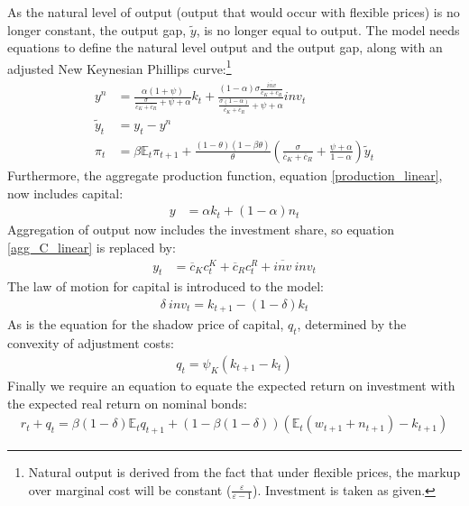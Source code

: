 \documentclass[titlepage]{\econtex}\newcommand{\texname}{ConsumptionHeterogeneity}
\begin{document}
As the natural level of output (output that would occur with flexible prices) is no longer constant, the output gap, $\tilde{y}$, is no longer equal to output. The model needs equations to define the natural level output and the output gap, along with an adjusted New Keynesian Phillips curve:\footnote{Natural output is derived from the fact that under flexible prices, the markup over marginal cost will be constant ($\frac{\varepsilon}{\varepsilon-1}$). Investment is taken as given.}
\begin{align}
y^{n} &= \frac{\alpha(1+\psi)}{\frac{\sigma }{\overline{c}_{K}+\overline{c}_{R}} + \psi+ \alpha} k_{t} +\frac{(1-\alpha) \sigma \frac{\overline{\textit{inv}}}{\overline{c}_{K}+\overline{c}_{R}}}{ \frac{\sigma (1-\alpha)}{\overline{c}_{K}+\overline{c}_{R}} + \psi + \alpha} \textit{inv}_t \label{y_nat_linear} \\
\tilde{y}_t &= y_t - y^{n}	\label{output_gap_linear} \\
\pi_t &=\beta \mathbb{E}_t\pi_{t+1}+\frac{(1-\theta)(1-\beta\theta)}{\theta}\left( \frac{\sigma}{\overline{c}_{K}+\overline{c}_{R}} +  \frac{\psi + \alpha}{1-\alpha} \right)\tilde{y}_t \label{NKphillips_linear_capital}
\end{align}
Furthermore, the aggregate production function, equation \ref{production_linear}, now includes capital:
\begin{align}
y &= \alpha k_t +  (1-\alpha)n_t  \label{production_capital_linear}
\end{align}
Aggregation of output now includes the investment share, so equation \ref{agg_C_linear} is replaced by:
\begin{align}
y_t &= \overline{c}_{K} c^K_t + \overline{c}_{R} c^R_t + \overline{\textit{inv}} \ \textit{inv}_t \label{agg_Y_linear}
\end{align}
The law of motion for capital is introduced to the model:
\begin{align}
\delta \ \textit{inv}_t = k_{t+1} - (1-\delta) k_{t}    \label{lom_capital}
\end{align}
As is the equation for the shadow price of capital, $q_t$, determined by the convexity of adjustment costs:
\begin{align}
q_t = \psi_K (k_{t+1}-k_t)	\label{shadow_K}
\end{align}
Finally we require an equation to equate the expected return on investment with the expected real return on nominal bonds:
\begin{align}
r_t + q_t = \beta (1-\delta) \mathbb{E}_t q_{t+1} + (1 - \beta (1-\delta)) (\mathbb{E}_t (w_{t+1} + n_{t+1}) - k_{t+1})	\label{return_K}
\end{align}
\end{document}
